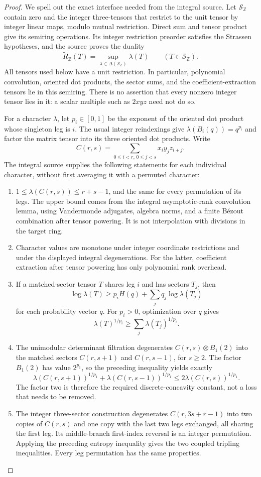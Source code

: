\begin{proof}
We spell out the exact interface needed from the integral
source.  Let $\mathcal S_{\mathbb Z}$ contain zero and the
integer three-tensors that restrict to the unit tensor by
integer linear maps, modulo mutual restriction.  Direct sum
and tensor product give its semiring operations.  Its integer
restriction preorder satisfies the Strassen hypotheses, and
the source proves the duality
\[
 \widetilde R_{\mathbb Z}(T)
   =\sup_{\lambda\in\Delta(\mathcal S_{\mathbb Z})}\lambda(T)
 \qquad(T\in\mathcal S_{\mathbb Z}).
\]
All tensors used below have a unit restriction.  In particular,
polynomial convolution, oriented dot products, the sector sums,
and the coefficient-extraction tensors lie in this semiring.
There is no assertion that every nonzero integer tensor lies
in it: a scalar multiple such as $2xyz$ need not do so.

For a character $\lambda$, let $p_i\in[0,1]$ be the exponent
of the oriented dot product whose singleton leg is $i$.
The usual integer reindexings give
$\lambda(B_i(q))=q^{p_i}$ and factor the matrix tensor into
its three oriented dot products.  Write
\[
 C(r,s)=\sum_{0\le i<r,\,0\le j<s}x_i y_j z_{i+j}.
\]
The integral source supplies the following statements for
each individual character, without first averaging it with a
permuted character:
\begin{enumerate}
\item $1\le\lambda(C(r,s))\le r+s-1$, and the same for
every permutation of its legs.  The upper bound comes from
the integral asymptotic-rank convolution lemma, using
Vandermonde adjugates, algebra norms, and a finite B\'ezout
combination after tensor powering.  It is not interpolation
with divisions in the target ring.
\item Character values are monotone under integer coordinate
restrictions and under the displayed integral degenerations.
For the latter, coefficient extraction after tensor powering
has only polynomial rank overhead.
\item If a matched-sector tensor $T$ shares leg $i$ and has
sectors $T_j$, then
\[
 \log\lambda(T)\ge p_i H(q)+\sum_jq_j\log\lambda(T_j)
\]
for each probability vector $q$.  For $p_i>0$, optimization
over $q$ gives
\[
 \lambda(T)^{1/p_i}\ge\sum_j\lambda(T_j)^{1/p_i}.
\]
\item The unimodular determinant filtration degenerates
$C(r,s)\otimes B_1(2)$ into the matched sectors
$C(r,s+1)$ and $C(r,s-1)$, for $s\ge2$.
The factor $B_1(2)$ has value $2^{p_1}$, so the preceding
inequality yields exactly
\[
 \lambda(C(r,s+1))^{1/p_1}
 +\lambda(C(r,s-1))^{1/p_1}
 \le2\lambda(C(r,s))^{1/p_1}.
\]
The factor two is therefore the required discrete-concavity
constant, not a loss that needs to be removed.
\item The integer three-sector construction degenerates
$C(r,3s+r-1)$ into two copies of $C(r,s)$ and one copy with
the last two legs exchanged, all sharing the first leg.
Its middle-branch first-index reversal is an integer
permutation.  Applying the preceding entropy inequality gives
the two coupled tripling inequalities.  Every leg permutation
has the same properties.
\end{enumerate}


\end{proof}
